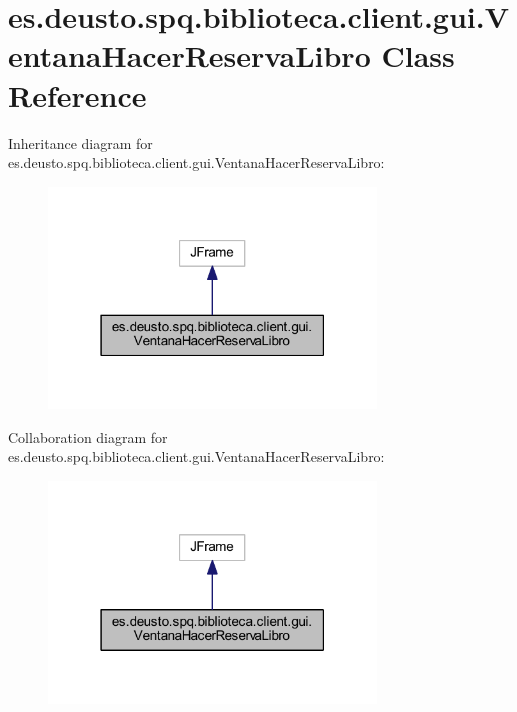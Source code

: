 \hypertarget{classes_1_1deusto_1_1spq_1_1biblioteca_1_1client_1_1gui_1_1_ventana_hacer_reserva_libro}{}\section{es.\+deusto.\+spq.\+biblioteca.\+client.\+gui.\+Ventana\+Hacer\+Reserva\+Libro Class Reference}
\label{classes_1_1deusto_1_1spq_1_1biblioteca_1_1client_1_1gui_1_1_ventana_hacer_reserva_libro}


Inheritance diagram for es.\+deusto.\+spq.\+biblioteca.\+client.\+gui.\+Ventana\+Hacer\+Reserva\+Libro\+:
\nopagebreak
\begin{figure}[H]
\begin{center}
\leavevmode
\includegraphics[width=247pt]{classes_1_1deusto_1_1spq_1_1biblioteca_1_1client_1_1gui_1_1_ventana_hacer_reserva_libro__inherit__graph}
\end{center}
\end{figure}


Collaboration diagram for es.\+deusto.\+spq.\+biblioteca.\+client.\+gui.\+Ventana\+Hacer\+Reserva\+Libro\+:
\nopagebreak
\begin{figure}[H]
\begin{center}
\leavevmode
\includegraphics[width=247pt]{classes_1_1deusto_1_1spq_1_1biblioteca_1_1client_1_1gui_1_1_ventana_hacer_reserva_libro__coll__graph}
\end{center}
\end{figure}
